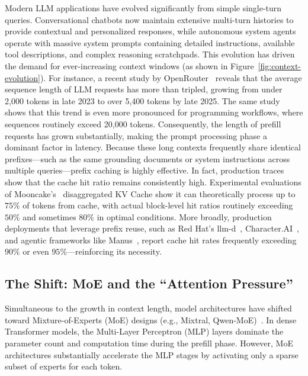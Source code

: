 \documentclass[letterpaper,twocolumn,10pt]{article}
\begin{document}
Modern LLM applications have evolved significantly from simple single-turn queries.
Conversational chatbots now maintain extensive multi-turn histories to provide contextual
and personalized responses, while autonomous system agents operate with massive
system prompts containing detailed instructions, available tool descriptions,
and complex reasoning scratchpads. This evolution has driven the demand for
ever-increasing context windows (as shown in Figure~\ref{fig:context-evolution}). 
For instance, a recent study by OpenRouter~\cite{aubakirova2026state} reveals
that the average sequence length of LLM requests has more than tripled,
growing from under 2,000 tokens in late 2023 to over 5,400 tokens by late 2025.
The same study shows that this trend is even more pronounced for programming
workflows, where sequences routinely exceed 20,000 tokens.
Consequently, the length of prefill requests
has grown substantially, making the prompt processing phase a dominant factor in latency.
Because these long contexts frequently share identical prefixes---such as the 
same grounding documents or system instructions across multiple queries---prefix
caching is highly effective.
In fact, production traces show that the cache hit ratio remains consistently
high.
Experimental evaluations of Mooncake's~\cite{qin2025mooncake} disaggregated
KV Cache show it can theoretically process up to $75\%$ of tokens from cache,
with actual block-level hit ratios routinely exceeding $50\%$ and sometimes
$80\%$ in optimal conditions.
More broadly, production deployments that leverage prefix reuse,
such as Red Hat's llm-d~\cite{hayes2026accelerate},
Character.AI~\cite{characterai2024optimizing}, and agentic frameworks like
Manus~\cite{purav2025manus}, report cache hit rates frequently exceeding
$90\%$ or even $95\%$---reinforcing its necessity.

\subsection{The Shift: MoE and the ``Attention Pressure''} 

Simultaneous to the growth in context length, model architectures have shifted toward
Mixture-of-Experts (MoE) designs (e.g., Mixtral, Qwen-MoE)~\cite{zhou2022mixture, shen2023mixture}.
In dense Transformer models, the Multi-Layer Perceptron (MLP) layers dominate the
parameter count and computation time during the prefill phase. However, MoE architectures
substantially accelerate the MLP stages by activating only a sparse subset of experts
for each token. 
\end{document}
